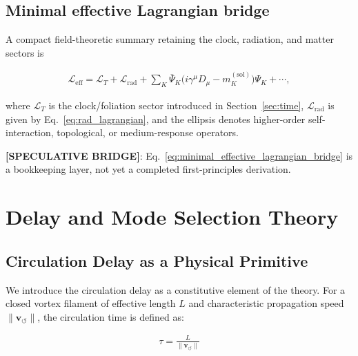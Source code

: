 \documentclass[11pt]{article}
\theoremstyle{definition}
\theoremstyle{plain}
\theoremstyle{remark}
\newcommand{\vnorm}{\lVert \mathbf{v}_{\!\boldsymbol{\circlearrowleft}} \rVert}
\begin{document}
    \subsection{Minimal effective Lagrangian bridge}

        A compact field-theoretic summary retaining the clock, radiation, and matter sectors is

        \begin{align}
            \mathcal{L}_{\mathrm{eff}}
            =
            \mathcal{L}_{T}
            +
            \mathcal{L}_{\mathrm{rad}}
            +
            \sum_K \bar\Psi_K\bigl(i\gamma^\mu D_\mu - m_K^{(\mathrm{sol})}\bigr)\Psi_K
            + \cdots,
            \label{eq:minimal_effective_lagrangian_bridge}
        \end{align}

        where $\mathcal{L}_{T}$ is the clock/foliation sector introduced in Section~\ref{sec:time}, $\mathcal{L}_{\mathrm{rad}}$ is given by Eq.~\eqref{eq:rad_lagrangian}, and the ellipsis denotes higher-order self-interaction, topological, or medium-response operators.

        \textbf{[SPECULATIVE BRIDGE]}: Eq.~\eqref{eq:minimal_effective_lagrangian_bridge} is a bookkeeping layer, not yet a completed first-principles derivation.

        
\section{Delay and Mode Selection Theory}
    \label{sec:delay}
    
    \subsection{Circulation Delay as a Physical Primitive}
        
        We introduce the circulation delay as a constitutive element of the theory.
        For a closed vortex filament of effective length $L$ and characteristic propagation speed $\vnorm$, the circulation time is defined as:
        
        \begin{align}
            \tau = \frac{L}{\vnorm}
            \label{eq:delay_time}
        \end{align}
        
\end{document}
